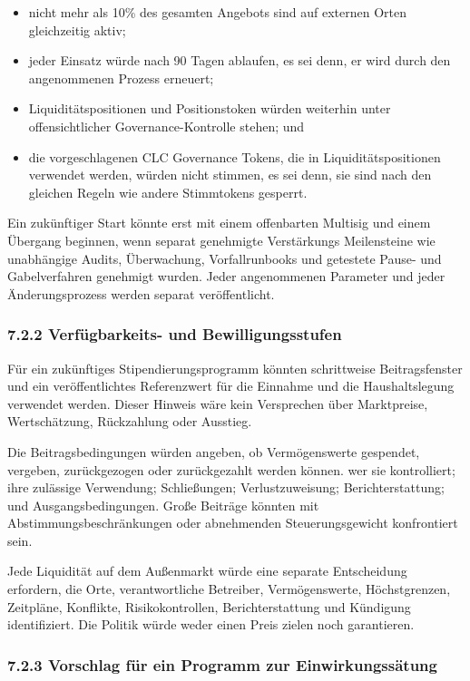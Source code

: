 \documentclass[11pt]{article}
\begin{document}
\begin{itemize}[leftmargin=*]
\item nicht mehr als 10\% des gesamten Angebots sind auf externen Orten gleichzeitig aktiv;
\item jeder Einsatz würde nach 90 Tagen ablaufen, es sei denn, er wird durch den angenommenen Prozess erneuert;
\item Liquiditätspositionen und Positionstoken würden weiterhin unter offensichtlicher Governance-Kontrolle stehen; und
\item die vorgeschlagenen CLC Governance Tokens, die in Liquiditätspositionen verwendet werden, würden nicht stimmen, es sei denn, sie sind nach den gleichen Regeln wie andere Stimmtokens gesperrt.
\end{itemize}
Ein zukünftiger Start könnte erst mit einem offenbarten Multisig und einem Übergang beginnen, wenn separat genehmigte Verstärkungs Meilensteine wie unabhängige Audits, Überwachung, Vorfallrunbooks und getestete Pause- und Gabelverfahren genehmigt wurden. Jeder angenommenen Parameter und jeder Änderungsprozess werden separat veröffentlicht.

\subsubsection*{7.2.2 Verfügbarkeits- und Bewilligungsstufen}

Für ein zukünftiges Stipendierungsprogramm könnten schrittweise Beitragsfenster und ein veröffentlichtes Referenzwert für die Einnahme und die Haushaltslegung verwendet werden. Dieser Hinweis wäre kein Versprechen über Marktpreise, Wertschätzung, Rückzahlung oder Ausstieg.

Die Beitragsbedingungen würden angeben, ob Vermögenswerte gespendet, vergeben, zurückgezogen oder zurückgezahlt werden können. wer sie kontrolliert; ihre zulässige Verwendung; Schließungen; Verlustzuweisung; Berichterstattung; und Ausgangsbedingungen. Große Beiträge könnten mit Abstimmungsbeschränkungen oder abnehmenden Steuerungsgewicht konfrontiert sein.

Jede Liquidität auf dem Außenmarkt würde eine separate Entscheidung erfordern, die Orte, verantwortliche Betreiber, Vermögenswerte, Höchstgrenzen, Zeitpläne, Konflikte, Risikokontrollen, Berichterstattung und Kündigung identifiziert. Die Politik würde weder einen Preis zielen noch garantieren.

\subsubsection*{7.2.3 Vorschlag für ein Programm zur Einwirkungssätung}
\end{document}
